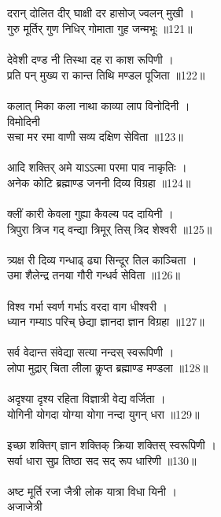\subsection{}
दरान् दोलित दीर् घाक्षी दर हासोज् ज्वलन् मुखी ।\\
गुरु मूर्तिर् गुण निधिर् गोमाता गुह जन्मभूः ॥121॥\\
\\
देवेशी दण्ड नी तिस्था दह रा काश रूपिणी ।\\
प्रति पन् मुख्य रा कान्त तिथि मण्डल पूजिता ॥122॥\\
\\
कलात् मिका कला नाथा काव्या लाप विनोदिनी ।\\
{\small{} विमोदिनी}\\
सचा मर रमा वाणी सव्य दक्षिण सेविता ॥123॥\\
\\
आदि शक्तिर् अमे याऽऽत्मा परमा पाव नाकृतिः ।\\
अनेक कोटि ब्रह्माण्ड जननी दिव्य विग्रहा ॥124॥\\
\\
क्लीं कारी केवला गुह्या कैवल्य पद दायिनी ।\\
त्रिपुरा त्रिज गद् वन्द्या त्रिमूर् तिस् त्रिद शेश्वरी ॥125॥\\
\\
त्र्यक्ष री दिव्य गन्धाढ् ढ्या सिन्दूर तिल काञ्चिता ।\\
उमा शैलेन्द्र तनया गौरी गन्धर्व सेविता ॥126॥\\
\\
विश्व गर्भा स्वर्ण गर्भाऽ वरदा वाग धीश्वरी ।\\
ध्यान गम्याऽ परिच् छेद्या ज्ञानदा ज्ञान विग्रहा ॥127॥\\
\\
सर्व वेदान्त संवेद्या सत्या नन्दस् स्वरूपिणी ।\\
लोपा मुद्रार् चिता लीला कॢप्त ब्रह्माण्ड मण्डला ॥128॥\\
\\
अदृश्या दृश्य रहिता विज्ञात्री वेद्य वर्जिता ।\\
योगिनी योगदा योग्या योगा नन्दा युगन् धरा ॥129॥\\
\\
इच्छा शक्तिग् ज्ञान शक्तिक् क्रिया शक्तिस् स्वरूपिणी ।\\
सर्वा धारा सुप्र तिष्ठा सद सद् रूप धारिणी ॥130॥\\
\\
अष्ट मूर्ति रजा जैत्री लोक यात्रा विधा यिनी । \\
{\small{} अजाजेत्री}\\
